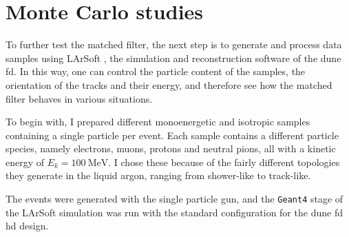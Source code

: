 \section{Monte Carlo studies}
\label{sec:matched_filter_mc_studies}

To further test the matched filter, the next step is to generate and process data samples using LArSoft \cite{Church2013}, the simulation and reconstruction software of the \gls{dune} \gls{fd}. In this way, one can control the particle content of the samples, the orientation of the tracks and their energy, and therefore see how the matched filter behaves in various situations.

To begin with, I prepared different monoenergetic and isotropic samples containing a single particle per event. Each sample contains a different particle species, namely electrons, muons, protons and neutral pions, all with a kinetic energy of $E_{k} = 100 \ \mathrm{MeV}$. I chose these because of the fairly different topologies they generate in the liquid argon, ranging from shower-like to track-like.

The events were generated with the single particle gun, and the \texttt{Geant4} \cite{GEANT42002,GEANT42006,GEANT42016} stage of the LArSoft simulation was run with the standard configuration for the \gls{dune} \gls{fd} \gls{hd} design.

